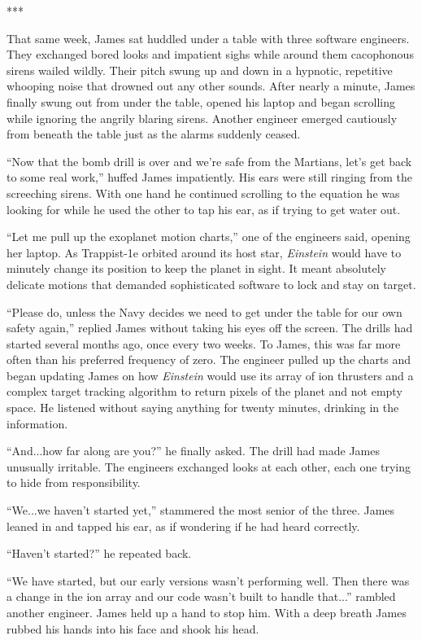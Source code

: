 \documentclass[12pt]{article} %
\begin{document}
\begin{center}
***
\end{center}

That same week, James sat huddled under a table with three software engineers. They exchanged bored looks and impatient sighs while around them cacophonous sirens wailed wildly. Their pitch swung up and down in a hypnotic, repetitive whooping noise that drowned out any other sounds. After nearly a minute, James finally swung out from under the table, opened his laptop and began scrolling while ignoring the angrily blaring sirens. Another engineer emerged cautiously from beneath the table just as the alarms suddenly ceased.

``Now that the bomb drill is over and we're safe from the Martians, let's get back to some real work,'' huffed James impatiently. His ears were still ringing from the screeching sirens. With one hand he continued scrolling to the equation he was looking for while he used the other to tap his ear, as if trying to get water out.

``Let me pull up the exoplanet motion charts,'' one of the engineers said, opening her laptop. As Trappist-1e orbited around its host star, \textit{Einstein} would have to minutely change its position to keep the planet in sight. It meant absolutely delicate motions that demanded sophisticated software to lock and stay on target.

``Please do, unless the Navy decides we need to get under the table for our own safety again,'' replied James without taking his eyes off the screen. The drills had started several months ago, once every two weeks. To James, this was far more often than his preferred frequency of zero. The engineer pulled up the charts and began updating James on how \textit{Einstein} would use its array of ion thrusters and a complex target tracking algorithm to return pixels of the planet and not empty space. He listened without saying anything for twenty minutes, drinking in the information.

``And...how far along are you?'' he finally asked. The drill had made James unusually irritable. The engineers exchanged looks at each other, each one trying to hide from responsibility.

``We...we haven't started yet,'' stammered the most senior of the three. James leaned in and tapped his ear, as if wondering if he had heard correctly.

``Haven't started?'' he repeated back.

``We have started, but our early versions wasn't performing well. Then there was a change in the ion array and our code wasn't built to handle that...'' rambled another engineer. James held up a hand to stop him. With a deep breath James rubbed his hands into his face and shook his head.
\end{document}
